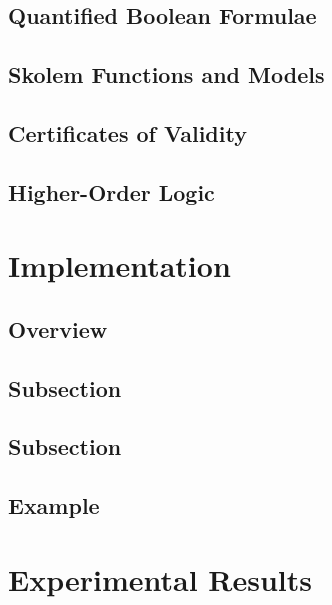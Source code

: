 \documentclass{llncs}
\begin{document}
\subsection{Quantified Boolean Formulae}

\subsection{Skolem Functions and Models}
\label{sec:models}

\subsection{Certificates of Validity}
\label{sec:certificates}

\subsection{Higher-Order Logic}
\label{sec:hol}


\section{Implementation}
\label{sec:checking}

\subsection{Overview}
\label{sec:checking-overview}

\subsection{Subsection}
\label{sec:preproc}

\subsection{Subsection}
\label{sec:hypelim}

\subsection{Example}


\section{Experimental Results}
\label{sec:experimental-results}
\end{document}
